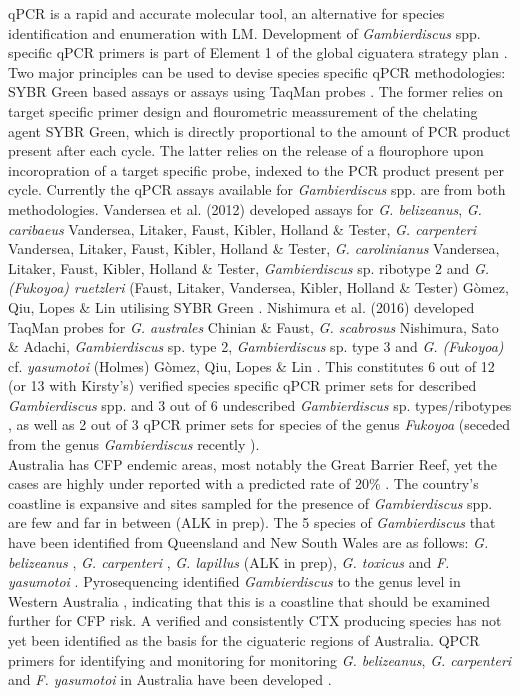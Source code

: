 \documentclass[12pt]{article}
\begin{document}
qPCR is a rapid and accurate molecular tool, an alternative for species identification and enumeration with LM. Development of \emph{Gambierdiscus} spp. specific qPCR primers is part of Element 1 of the global ciguatera strategy plan \citep{globalcig}. Two major principles can be used to devise species specific qPCR methodologies: SYBR Green based assays or assays using TaqMan probes \citep{smith2009advantages}. The former relies on target specific primer design and flourometric meassurement of the chelating agent SYBR Green, which is directly proportional to the amount of PCR product present after each cycle. The latter relies on the release of a flourophore upon incoropration of a target specific probe, indexed to the PCR product present per cycle. Currently the qPCR assays available for  \emph{Gambierdiscus} spp. are from both methodologies. Vandersea et al. (2012) developed assays for \emph{G. belizeanus}, \emph{G. caribaeus} Vandersea, Litaker, Faust, Kibler, Holland \& Tester, \emph{G. carpenteri} Vandersea, Litaker, Faust, Kibler, Holland \& Tester, \emph{G. carolinianus} Vandersea, Litaker, Faust, Kibler, Holland \& Tester, \emph{Gambierdiscus} sp. ribotype 2 and \emph{G. (Fukoyoa) ruetzleri} (Faust, Litaker, Vandersea, Kibler, Holland \& Tester) G\`omez, Qiu, Lopes \& Lin utilising SYBR Green \citep{vandersea2012development}. Nishimura et al. (2016) developed TaqMan probes for  \emph{G. australes} Chinian \& Faust, \emph{G. scabrosus} Nishimura, Sato \& Adachi, \emph{Gambierdiscus} sp. type 2, \emph{Gambierdiscus} sp. type 3 and \emph{G. (Fukoyoa)} cf. \emph{yasumotoi} (Holmes) G\`omez, Qiu, Lopes \& Lin \citep{nishimura2016quantitative}. This constitutes 6 out of 12 (or 13 with Kirsty's) verified species specific qPCR primer sets for described \emph{Gambierdiscus} spp. and  3 out of 6 undescribed \emph{Gambierdiscus} sp. types/ribotypes , as well as 2 out of 3 qPCR primer sets for species of the genus \emph{Fukoyoa} (seceded from the genus \emph{Gambierdiscus} recently \citep{gomez2015fukuyoa}).\\
Australia has CFP endemic areas, most notably the Great Barrier Reef, yet the cases are highly under reported with a predicted rate of 20\%  \citep{lewis2006ciguatera}. The country's coastline is expansive and sites sampled for the presence of \emph{Gambierdiscus} spp. are few and far in between (ALK in prep). The 5 species of \emph{Gambierdiscus} that have been identified from Queensland and New South Wales are as follows:  \emph{G. belizeanus}  \citep{murray2014molecular}, \emph{G. carpenteri} \citep{kohli2014high}, \emph{G. lapillus} (ALK in prep), \emph{G. toxicus} \citep{hallegraeff2010algae} and \emph{F. yasumotoi}  \citep{murray2014molecular}. Pyrosequencing identified \emph{Gambierdiscus} to the genus level in Western Australia \citep{kohli2014cob} , indicating that this is a coastline that should be examined further for CFP risk. A verified and consistently CTX producing species has not yet been identified as the basis for the ciguateric regions of Australia. 
QPCR primers for identifying and monitoring for monitoring \emph{G. belizeanus}, \emph{G. carpenteri} and \emph{F. yasumotoi} in Australia have been developed \citep{nishimura2016quantitative,vandersea2012development}.
\end{document}
